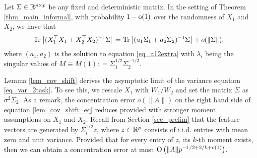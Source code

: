\begin{lemma}\label{lem_cov_shift}
	Let $\Sigma \in \mathbb{R}^{p \times p}$ be any fixed and deterministic matrix.
	In the setting of Theorem \ref{thm_main_informal},
	with probability $1-\operatorname{o}(1)$ over the randomness of $X_1$ and $X_2$, we have that %
	\begin{align}\label{lem_cov_shift_eq}
		\bigtr{(X_1^{\top}X_1 + X_2^{\top}X_2)^{-1} \Sigma} = \bigtr{ (a_1 \Sigma_1 + a_2\Sigma_2)^{-1} \Sigma} + o(\norm{\Sigma}), %
	\end{align}
where $(a_1,a_2)$ is the solution to equation \eqref{eq_a12extra} with $\lambda_i$ being the singular values of $M\equiv M(1): = \Sigma_1^{1/2}\Sigma_2^{-1/2}$.
\end{lemma}

Lemma \ref{lem_cov_shift} derives the asymptotic limit of the variance equation \eqref{eq_var_2task}.
To see this, we rescale $X_1$ with $W_1 / W_2$ and set the matrix $\Sigma$ as $\sigma^2 \Sigma_2$.
As a remark, the concentration error $o(\|A\|)$ on the right hand side of equation \eqref{lem_cov_shift_eq} reduces provided with stronger moment assumptions on $X_1$ and $X_2$. %
Recall from Section \ref{sec_prelim} that the feature vectors are generated by $\Sigma_i^{1/2} z$, where $z\in\mathbb{R}^p$ consists of i.i.d. entries with mean zero and unit variance.
Provided that for every entry of $z$, its $k$-th moment exists, then we can obtain a concentration error at most $\operatorname{O}\left(\|A\| p^{-1/2 + 2/k + o(1)}\right)$.

